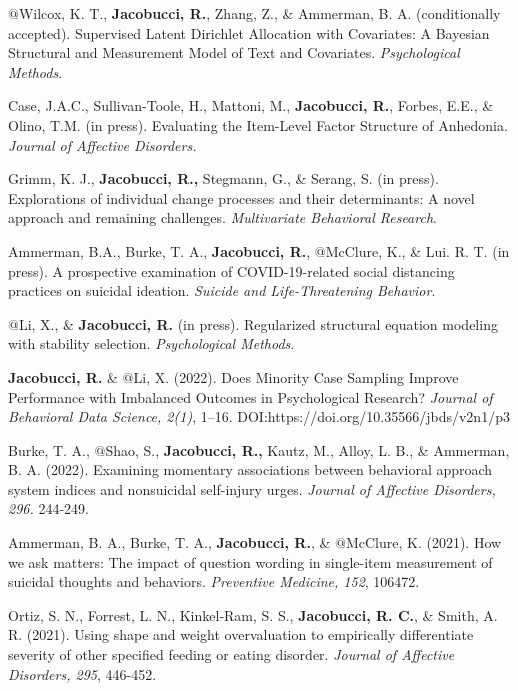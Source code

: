 \documentclass[letterpaper,10pt]{article}
\begin{document}
\begin{etaremune}
	
	\item $@$Wilcox, K. T., \textbf{Jacobucci, R.}, Zhang, Z., \& Ammerman, B. A. (conditionally accepted). Supervised Latent Dirichlet Allocation with Covariates: A Bayesian Structural and Measurement Model of Text and Covariates. \emph{Psychological Methods}.
	
	
	\item Case, J.A.C., Sullivan-Toole, H., Mattoni, M., \textbf{Jacobucci, R.}, Forbes, E.E., \& Olino, T.M. (in press). Evaluating the Item-Level Factor Structure of Anhedonia. \emph{Journal of Affective Disorders.}
	
	\item Grimm, K. J., \textbf{Jacobucci, R.,} Stegmann, G., \& Serang, S. (in press). Explorations of individual change processes and their determinants: A novel approach and remaining challenges. \emph{Multivariate Behavioral Research}.
	\item Ammerman, B.A., Burke, T. A., \textbf{Jacobucci, R.}, $@$McClure, K., \& Lui. R. T. (in press). A prospective examination of COVID-19-related social distancing practices on suicidal ideation. \emph{Suicide and Life-Threatening Behavior}.
	\item $@$Li, X., \& \textbf{Jacobucci, R.} (in press). Regularized structural equation modeling with stability selection. \emph{Psychological Methods}.
		\item \textbf{Jacobucci, R.} \& $@$Li, X. (2022). Does Minority Case Sampling Improve Performance with Imbalanced Outcomes in Psychological Research? \emph{Journal of Behavioral Data Science, 2(1)}, 1–16. DOI:https://doi.org/10.35566/jbds/v2n1/p3
	\item Burke, T. A., $@$Shao, S., \textbf{Jacobucci, R.,} Kautz, M., Alloy, L. B., \& Ammerman, B. A. (2022). Examining momentary associations between behavioral approach system indices and nonsuicidal self-injury urges. \emph{Journal of Affective Disorders, 296.} 244-249.
	\item Ammerman, B. A., Burke, T. A., \textbf{Jacobucci, R.}, \& $@$McClure, K. (2021). How we ask matters: The impact of question wording in single-item measurement of suicidal thoughts and behaviors. \emph{Preventive Medicine, 152}, 106472.
	\item Ortiz, S. N., Forrest, L. N., Kinkel-Ram, S. S., \textbf{Jacobucci, R. C.}, \& Smith, A. R. (2021). Using shape and weight overvaluation to empirically differentiate severity of other specified feeding or eating disorder. \emph{Journal of Affective Disorders, 295}, 446-452.

\end{etaremune}
\end{document}
